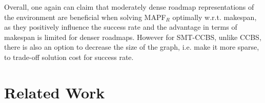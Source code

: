 \documentclass[review]{elsarticle}
\newcommand{\ccbs}{\ac{CCBS}\xspace}
\newcommand{\mapfr}{\ac{MAPF}$_R$\xspace}
\newcommand{\smtccbs}{SMT-CCBS\xspace}
\begin{document}
Overall, one again can claim that moderately dense roadmap representations of the environment are beneficial when solving \mapfr optimally w.r.t. makespan, as they positively influence the success rate and the advantage in terms of makespan is limited for denser roadmaps. However for \smtccbs, unlike \ccbs, there is also an option to decrease the size of the graph, i.e. make it more sparse, to trade-off solution cost for success rate.


\section{Related Work}
\label{sec:related-work}
\end{document}
